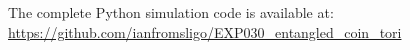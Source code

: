 The complete Python simulation code is available at:
\url{https://github.com/ianfromsligo/EXP030_entangled_coin_tori}
